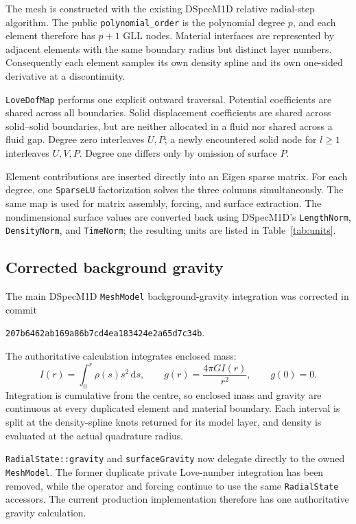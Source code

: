 \documentclass[11pt,a4paper]{article}
\newcommand{\code}[1]{\texttt{#1}}
\newcommand{\dd}{\,\mathrm{d}}
\begin{document}
The mesh is constructed with the existing DSpecM1D relative radial-step
algorithm.  The public \code{polynomial\_order} is the polynomial degree
\(p\), and each element therefore has \(p+1\) GLL nodes.  Material interfaces
are represented by adjacent elements with the same boundary radius but
distinct layer numbers.  Consequently each element samples its own density
spline and its own one-sided derivative at a discontinuity.

\code{LoveDofMap} performs one explicit outward traversal.  Potential
coefficients are shared across all boundaries.  Solid displacement
coefficients are shared across solid--solid boundaries, but are neither
allocated in a fluid nor shared across a fluid gap.  Degree zero interleaves
\(U,P\); a newly encountered solid node for \(l\geq1\) interleaves
\(U,V,P\).  Degree one differs only by omission of surface \(P\).

Element contributions are inserted directly into an Eigen sparse matrix.
For each degree, one \code{SparseLU} factorization solves the three columns
simultaneously.  The same map is used for matrix assembly, forcing, and
surface extraction.  The nondimensional surface values are converted back
using DSpecM1D's \code{LengthNorm}, \code{DensityNorm}, and \code{TimeNorm};
the resulting units are listed in Table~\ref{tab:units}.

\subsection{Corrected background gravity}

The main DSpecM1D \code{MeshModel} background-gravity integration was
corrected in commit
\begin{center}
\code{207b6462ab169a86b7cd4ea183424e2a65d7c34b}.
\end{center}
The authoritative calculation integrates enclosed mass:
\begin{equation}
 I(r)=\int_0^r\rho(s)s^2\dd s,\qquad
 g(r)=\frac{4\pi G I(r)}{r^2},\qquad g(0)=0. \label{eq:gravity}
\end{equation}
Integration is cumulative from the centre, so enclosed mass and gravity are
continuous at every duplicated element and material boundary.  Each interval
is split at the density-spline knots returned for its model layer, and
density is evaluated at the actual quadrature radius.

\code{RadialState::gravity} and \code{surfaceGravity} now delegate directly
to the owned \code{MeshModel}.  The former duplicate private Love-number
integration has been removed, while the operator and forcing continue to use
the same \code{RadialState} accessors.  The current production implementation
therefore has one authoritative gravity calculation.
\end{document}
